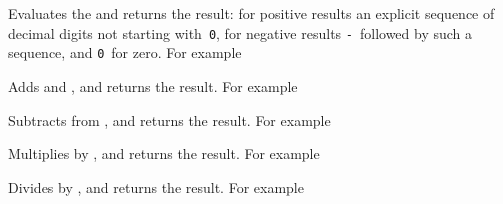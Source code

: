 \documentclass[oneside]{book}
\begin{document}
\begin{function}{\IntEval}
\begin{syntax}
 
\end{syntax}
Evaluates the  and returns the result:
for positive results an
explicit sequence of decimal digits not starting with~\texttt{0},
for negative results \texttt{-}~followed by such a sequence, and
\texttt{0}~for zero. For example
\begin{demo}
\end{demo}
\end{function}

\begin{function}{\IntMathAdd}
\begin{syntax}
  
\end{syntax}
Adds  and ,
and returns the result. For example
\begin{demo}
\end{demo}
\end{function}

\begin{function}{\IntMathSub}
\begin{syntax}
  
\end{syntax}
Subtracts  from ,
and returns the result. For example
\begin{demo}
\end{demo}
\end{function}

\begin{function}{\IntMathMult}
\begin{syntax}
  
\end{syntax}
Multiplies  by ,
and returns the result. For example
\begin{demo}
\end{demo}
\end{function}

\begin{function}{\IntMathDiv}
\begin{syntax}
  
\end{syntax}
Divides  by ,
and returns the result. For example
\begin{demo}
\end{demo}
\end{function}
\end{document}
